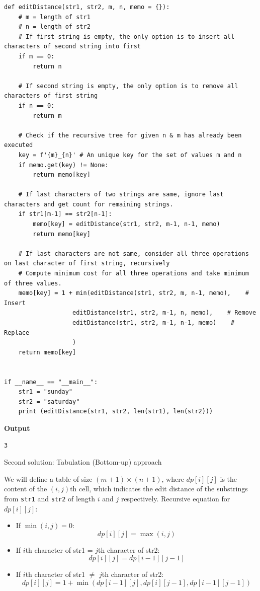 \documentclass[a4paper,11pt]{book}
\begin{document}
\begin{lstlisting}
def editDistance(str1, str2, m, n, memo = {}):
    # m = length of str1
    # n = length of str2
    # If first string is empty, the only option is to insert all characters of second string into first
    if m == 0:
        return n
 
    # If second string is empty, the only option is to remove all characters of first string
    if n == 0:
        return m

    # Check if the recursive tree for given n & m has already been executed
    key = f'{m}_{n}' # An unique key for the set of values m and n
    if memo.get(key) != None:
        return memo[key]
    
    # If last characters of two strings are same, ignore last characters and get count for remaining strings.
    if str1[m-1] == str2[n-1]:
        memo[key] = editDistance(str1, str2, m-1, n-1, memo)
        return memo[key]
 
    # If last characters are not same, consider all three operations on last character of first string, recursively
    # Compute minimum cost for all three operations and take minimum of three values.
    memo[key] = 1 + min(editDistance(str1, str2, m, n-1, memo),    # Insert
                   editDistance(str1, str2, m-1, n, memo),    # Remove
                   editDistance(str1, str2, m-1, n-1, memo)    # Replace
                   )
    return memo[key]
 
 
if __name__ == "__main__":
    str1 = "sunday"
    str2 = "saturday"
    print (editDistance(str1, str2, len(str1), len(str2)))
\end{lstlisting}
\textbf{Output}
\begin{lstlisting}
3
\end{lstlisting}

\noindent Second solution: Tabulation (Bottom-up) approach

\noindent We will define a table of size $(m+1) \times (n+1)$, where $dp[i][j]$ is the content of the $(i,j)$th cell, which indicates the edit distance of the substrings from \lstinline{str1} and \lstinline{str2} of length $i$ and $j$ respectively. Recursive equation for $dp[i][j]$:

\begin{itemize}
\item If $\min(i,j) = 0$:
$$dp[i][j] = \max(i, j)$$
\item If $i$th character of str1 = $j$th character of str2:
$$dp[i][j] = dp[i-1][j-1]$$
\item If $i$th character of str1 $\neq$ $j$th character of str2:
$$dp[i][j] = 1 + \min \left(dp[i-1][j], dp[i][j-1], dp[i-1][j-1]\right)$$
\end{itemize}
\end{document}
